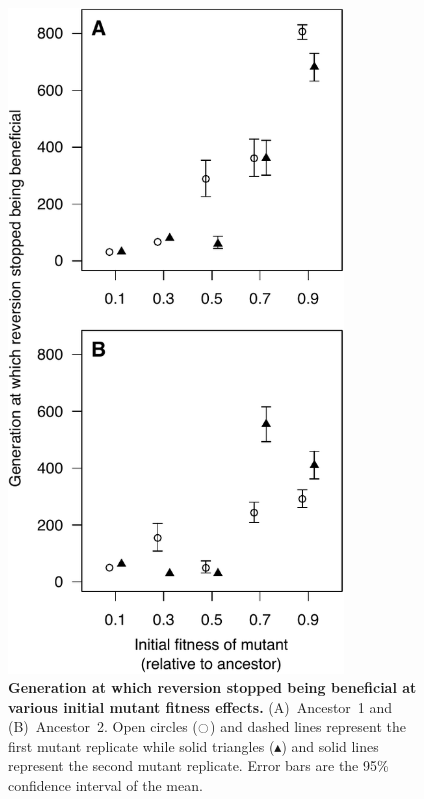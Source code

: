 \begin{doublespace}
\begin{figure}
\begin{center}
\includegraphics[width=3.5in]{first-update-rev-bad-W.pdf}
\end{center}
\caption{{\bf Generation at which reversion stopped being beneficial
  at various initial mutant fitness effects.}
  (A)~Ancestor~1 and (B)~Ancestor~2.
  Open circles ($\ocircle$) and dashed lines
  represent the first mutant replicate
  while solid triangles ($\blacktriangle$) and solid lines
  represent the second mutant replicate.
  Error bars are the 95\% confidence interval of the mean.}
\label{fig:first-update-rev-bad-W}
\end{figure}




\end{doublespace}
